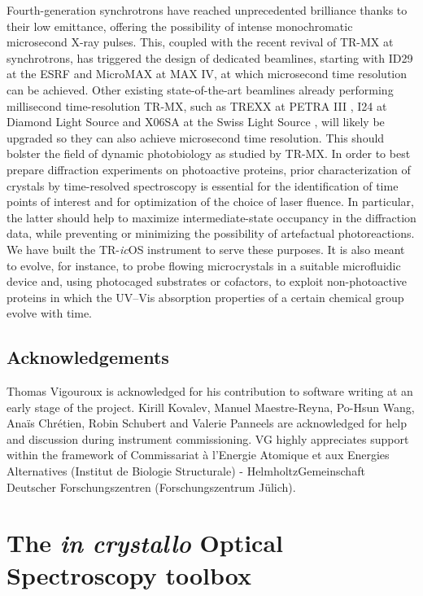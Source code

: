 Fourth-generation synchrotrons have reached unprecedented brilliance thanks to their low emittance, offering the possibility of intense monochromatic microsecond X-ray pulses. This, coupled with the recent revival of TR-MX at synchrotrons, has triggered the design of dedicated beamlines, starting with ID29 at the ESRF and MicroMAX at MAX IV, at which microsecond time resolution can be achieved. Other existing state-of-the-art beamlines already performing millisecond time-resolution TR-MX, such as TREXX at PETRA III \parencite{schulzHitandreturnSystemEnables2018}, I24 at Diamond Light Source \parencite{baxterObservationCationChromophore2022} and X06SA at the Swiss Light Source \parencite{weinertProtonUptakeMechanism2019}, will likely be upgraded so they can also achieve microsecond time resolution. This should bolster the field of dynamic photobiology as studied by TR-MX. In order to best prepare diffraction experiments on photoactive proteins, prior characterization of crystals by time-resolved spectroscopy is essential for the identification of time points of interest and for optimization of the choice of laser fluence. In particular, the latter should help to maximize intermediate-state occupancy in the diffraction data, while preventing or minimizing the possibility of artefactual photoreactions. We have built the TR-\textit{ic}OS instrument to serve these purposes. It is also meant to evolve, for instance, to probe flowing microcrystals in a suitable microfluidic device and, using photocaged substrates or cofactors, to exploit non-photoactive proteins in which the UV–Vis absorption properties of a certain chemical group evolve with time.

\section{Acknowledgements}

Thomas Vigouroux is acknowledged for his contribution to software writing at an early stage of the project. Kirill Kovalev, Manuel Maestre-Reyna, Po-Hsun Wang, Anaïs Chrétien, Robin Schubert and Valerie Panneels are acknowledged for help and discussion during instrument commissioning. VG highly appreciates support within the framework of Commissariat à l’Energie Atomique et aux Energies Alternatives (Institut de Biologie Structurale) - HelmholtzGemeinschaft Deutscher Forschungszentren (Forschungszentrum Jülich).


\chapter{The \textit{in crystallo} Optical Spectroscopy toolbox}\label{chap:toolbox}

